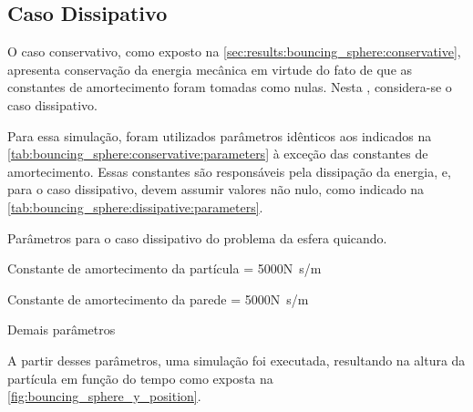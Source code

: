 \subsection{Caso Dissipativo} \label{sec:results:bouncing_sphere:dissipative}

O caso conservativo, como exposto na \cref{sec:results:bouncing_sphere:conservative}, apresenta conservação da energia mecânica em virtude do fato de que as constantes de amortecimento foram tomadas como nulas. Nesta , considera-se o caso dissipativo.

Para essa simulação, foram utilizados parâmetros idênticos aos indicados na \cref{tab:bouncing_sphere:conservative:parameters} à exceção das constantes de amortecimento. Essas constantes são responsáveis pela dissipação da energia, e, para o caso dissipativo, devem assumir valores não nulo, como indicado na \cref{tab:bouncing_sphere:dissipative:parameters}.

\begin{table}[h]
\centering
\caption{Parâmetros para o caso dissipativo do problema da esfera quicando.}
\label{tab:bouncing_sphere:dissipative:parameters}
\begin{parametersdesc}{0.8\textwidth}
	\item{Constante de amortecimento da partícula}{\ind{\normalDampingConstant}{\particle} = \num{5000}}{\si[per-mode=symbol]{\newton\second\per\meter}}
	\item{Constante de amortecimento da parede}{\ind{\normalDampingConstant}{\element} = \num{5000}}{\si[per-mode=symbol]{\newton\second\per\meter}}
	\item{Demais parâmetros}{}{}
\end{parametersdesc}
\sourceMe 
\end{table}

A partir desses parâmetros, uma simulação foi executada, resultando na altura da partícula em função do tempo como exposta na \cref{fig:bouncing_sphere_y_position}.

